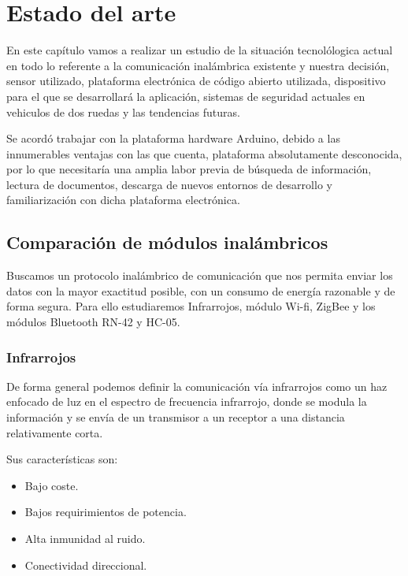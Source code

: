 	\chapter{Estado del arte}\label{cap.estadoDelArte}
	
	En este cap\'itulo vamos a realizar un estudio de la situaci\'on tecnol\'ologica actual en todo lo referente a la comunicaci\'on inal\'ambrica existente y nuestra decisi\'on, sensor utilizado, plataforma electr\'onica de c\'odigo abierto utilizada, dispositivo para el que se desarrollar\'a la aplicaci\'on, sistemas de seguridad actuales en vehiculos de dos ruedas y las tendencias futuras.
	
	Se acord\'o trabajar con la plataforma hardware Arduino, debido a las innumerables ventajas con las que cuenta, plataforma absolutamente desconocida, por lo que necesitar\'ia una amplia labor previa de búsqueda de informaci\'on, lectura de documentos, descarga de nuevos entornos de desarrollo y familiarizaci\'on con dicha plataforma electr\'onica.
	
	\section{Comparaci\'on de m\'odulos inal\'ambricos}
	
		Buscamos un protocolo inal\'ambrico de comunicaci\'on que nos permita enviar los datos con la mayor exactitud posible, con un consumo de energ\'ia razonable y de forma segura. Para ello estudiaremos Infrarrojos, m\'odulo Wi-fi, ZigBee y los m\'odulos Bluetooth RN-42 y HC-05.
		
		\subsection{Infrarrojos}
		
			De forma general podemos definir la comunicaci\'on v\'ia infrarrojos como un haz enfocado de luz en el espectro de frecuencia infrarrojo, donde se modula la informaci\'on y se env\'ia de un transmisor a un receptor a una distancia
			relativamente corta.
			
			Sus caracter\'isticas son:
		
			\begin{itemize}	
				\item Bajo coste.
				\item Bajos requirimientos de potencia.
				\item Alta inmunidad al ruido.
				\item Conectividad direccional.
			\end{itemize}
			
